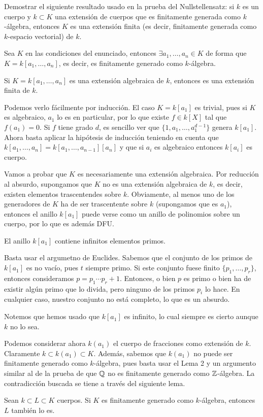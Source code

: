 \documentclass[twoside]{article}
\begin{document}
\newpage

\begin{ejercicio}{2} Demostrar el siguiente resultado usado en la prueba del Nullstellensatz: si $k$ es un cuerpo y $k \subset K$ una extensión de cuerpos que es finitamente generada como $k$-álgebra, entonces $K$ es una extensión finita (es decir, finitamente generada como $k$-espacio vectorial) de $k$.
\begin{solucion}
Sea $K$ en las condiciones del enunciado, entonces $\exists a_1,\dotsc,a_n \in K$ de forma que $K=k[a_1,\dotsc,a_n]$, es decir, es finitamente generado como $k$-álgebra. 
\begin{lema} Si $K=k[a_1,\dotsc,a_n]$ es una extensión algebraica de $k$, entonces es una extensión finita de $k$.
\end{lema}
\begin{dem}
Podemos verlo fácilmente por inducción. El caso $K=k[a_1]$ es trivial, pues si $K$ es algebraico, $a_1$ lo es en particular, por lo que existe $f\in k[X]$ tal que $f(a_1)=0$. Si $f$ tiene grado $d$, es sencillo ver que $\{1,a_1,\dotsc,a_1^{d-1}\}$ genera $k[a_1]$. Ahora basta aplicar la hipótesis de inducción teniendo en cuenta que $k[a_1,\dotsc,a_n]=k[a_1,\dotsc,a_{n-1}][a_n]$ y que si $a_i$ es algebraico entonces $k[a_i]$ es cuerpo.
\end{dem}

Vamos a probar que $K$ es necesariamente una extensión algebraica. Por reducción al absurdo, supongamos que $K$ no es una extensión algebraica de $k$, es decir, existen elementos trascentendes sobre $k$. Obviamente, al menos uno de los generadores de $K$ ha de ser trascentente sobre $k$ (supongamos que es $a_1$), entonces el anillo $k[a_1]$ puede verse como un anillo de polinomios sobre un cuerpo, por lo que es además DFU.

\begin{lema}El anillo $k[a_1]$ contiene infinitos elementos primos.
\end{lema}
\begin{dem}
Basta usar el argumetno de Euclides. Sabemos que el conjunto de los primos de $k[a_1]$ es no vacío, pues $t$ siempre primo. Si este conjunto fuese finito $\{p_1,\dotsc,p_r\}$, entonces consideramos $p=p_1\cdots p_r +1$. Entonces, o bien $p$ es primo o bien ha de existir algún primo que lo divida, pero ninguno de los primos $p_i$ lo hace. En cualquier caso, nuestro conjunto no está completo, lo que es un absurdo.

Notemos que hemos usado que $k[a_1]$ es infinito, lo cual siempre es cierto aunque $k$ no lo sea.
\end{dem}
Podemos considerar ahora $k(a_1)$ el cuerpo de fracciones como extensión de $k$. Claramente $k\subset k(a_1)\subset K$. Además, sabemos que $k(a_1)$ no puede ser finitamente generado como $k$-álgebra, pues basta usar el Lema 2 y un argumento similar al de la prueba de que $\mathbb{Q}$ no es finitamente generado como $\mathbb{Z}$-álgebra. La contradicción buscada se tiene a través del siguiente lema.
\begin{lema} Sean $k \subset L \subset K$ cuerpos. Si $K$ es finitamente generado como $k$-álgebra, entonces $L$ también lo es.
\end{lema}


\end{solucion}
\end{ejercicio}
\end{document}

